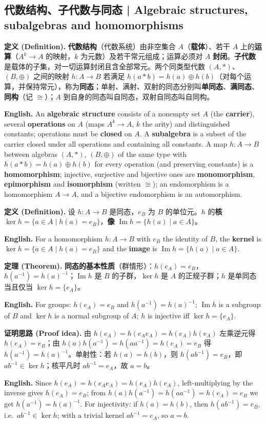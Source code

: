 \documentclass[UTF8,11pt,a4paper]{ctexart}
\newcommand{\EN}[1]{\par\noindent \textbf{English.} #1\par}
\newcommand{\DEF}[2]{\par\noindent\textbf{定义 (Definition).} #1\par\EN{#2}}
\newcommand{\THM}[2]{\par\noindent\textbf{定理 (Theorem).} #1\par\EN{#2}}
\newcommand{\PRF}[2]{\par\noindent\textbf{证明思路 (Proof idea).} #1\par\EN{#2}}
\begin{document}
\subsection{代数结构、子代数与同态 | Algebraic structures, subalgebras and homomorphisms}
\DEF{\textbf{代数结构}（代数系统）由非空集合 $A$（\textbf{载体}）、若干 $A$ 上的\textbf{运算}（$A^k\to A$ 的映射，$k$ 为元数）及若干常元组成；运算必须对 $A$ \textbf{封闭}。\textbf{子代数}是载体的子集，对一切运算封闭且含全部常元。两个同类型代数 $(A,*)$、$(B,\oplus)$ 之间的映射 $h:A\to B$ 若满足 $h(a*b)=h(a)\oplus h(b)$（对每个运算，并保持常元），称为\textbf{同态}；单射、满射、双射的同态分别叫\textbf{单同态}、\textbf{满同态}、\textbf{同构}（记 $\cong$）；$A$ 到自身的同态叫自同态，双射自同态叫自同构。}{An \textbf{algebraic structure} consists of a nonempty set $A$ (the \textbf{carrier}), several \textbf{operations} on $A$ (maps $A^k\to A$, $k$ the arity) and distinguished constants; operations must be \textbf{closed} on $A$. A \textbf{subalgebra} is a subset of the carrier closed under all operations and containing all constants. A map $h:A\to B$ between algebras $(A,*)$, $(B,\oplus)$ of the same type with $h(a*b)=h(a)\oplus h(b)$ for every operation (and preserving constants) is a \textbf{homomorphism}; injective, surjective and bijective ones are \textbf{monomorphism}, \textbf{epimorphism} and \textbf{isomorphism} (written $\cong$); an endomorphism is a homomorphism $A\to A$, and a bijective endomorphism is an automorphism.}
\DEF{设 $h:A\to B$ 是同态，$e_B$ 为 $B$ 的单位元。$h$ 的\textbf{核} $\ker h=\{a\in A\mid h(a)=e_B\}$，\textbf{像} $\operatorname{Im}h=\{h(a)\mid a\in A\}$。}{For a homomorphism $h:A\to B$ with $e_B$ the identity of $B$, the \textbf{kernel} is $\ker h=\{a\in A\mid h(a)=e_B\}$ and the \textbf{image} is $\operatorname{Im}h=\{h(a)\mid a\in A\}$.}
\THM{\textbf{同态的基本性质}（群情形）：$h(e_A)=e_B$，$h(a^{-1})=h(a)^{-1}$；$\operatorname{Im}h$ 是 $B$ 的子群，$\ker h$ 是 $A$ 的正规子群；$h$ 是单同态当且仅当 $\ker h=\{e_A\}$。}{For groups: $h(e_A)=e_B$ and $h(a^{-1})=h(a)^{-1}$; $\operatorname{Im}h$ is a subgroup of $B$ and $\ker h$ is a normal subgroup of $A$; $h$ is injective iff $\ker h=\{e_A\}$.}
\PRF{由 $h(e_A)=h(e_Ae_A)=h(e_A)h(e_A)$ 左乘逆元得 $h(e_A)=e_B$；由 $h(a)h(a^{-1})=h(aa^{-1})=h(e_A)=e_B$ 得 $h(a^{-1})=h(a)^{-1}$。单射性：若 $h(a)=h(b)$，则 $h(ab^{-1})=e_B$，即 $ab^{-1}\in\ker h$；核平凡时 $ab^{-1}=e_A$，故 $a=b$。}{Since $h(e_A)=h(e_Ae_A)=h(e_A)h(e_A)$, left-multiplying by the inverse gives $h(e_A)=e_B$; from $h(a)h(a^{-1})=h(aa^{-1})=h(e_A)=e_B$ we get $h(a^{-1})=h(a)^{-1}$. For injectivity: if $h(a)=h(b)$, then $h(ab^{-1})=e_B$, i.e.\ $ab^{-1}\in\ker h$; with a trivial kernel $ab^{-1}=e_A$, so $a=b$.}
\end{document}
